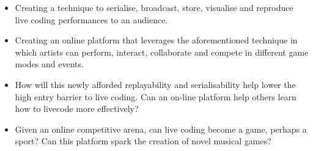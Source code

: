 \documentclass[12pt]{article}
\begin{document}
\begin{itemize}

\item
Creating a technique to serialise, broadcast, store, visualise and reproduce live coding performances to an audience.

\item
Creating an online platform that leverages the aforementioned technique in which artists can perform, interact, collaborate and compete in different game modes and events.

\item
How will this newly afforded replayability and serialisability help lower the high entry barrier to live coding. Can an on-line platform help others learn how to livecode more effectively?

\item
Given an online competitive arena, can live coding become a game, perhaps a sport? Can this platform spark the creation of novel musical games?
\end{itemize}

\printbibliography
\end{document}
